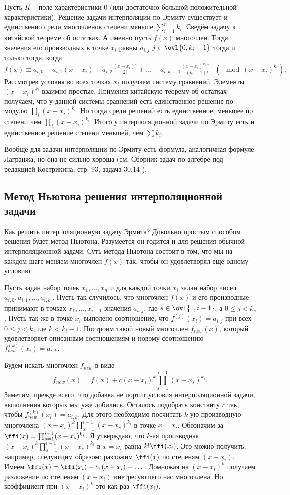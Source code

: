 \thrm Пусть $K$ -- поле характеристики 0 (или достаточно большой положительной характеристики). Решение задачи интерполяции по Эрмиту существует и единственно среди многочленов степени меньше $\sum_{i=1}^n k_i$.
\ethrm
\proof Сведём задачу к китайской теореме об остатках. А именно пусть $f(x)$ многочлен. Тогда значения его производных в точке $x_i$ равны $a_{i,j}$ $j\in \ovl{0,k_i-1}$ тогда и только тогда, когда
$$f(x)\equiv a_{i,0}+a_{i,1}(x-x_i)+a_{i,2}\tfrac{(x-x_i)^2}{2!}+\dots+ a_{i,k_i-1}\tfrac{(x-x_i)^{k_i-1}}{(k_i-1)!}\,\, (\mod (x-x_i)^{k_i}).$$
Рассмотрев условия во всех точках $x_i$ получаем систему сравнений. Элементы $(x-x_i)^{k_i}$ взаимно простые. Применяя китайскую теорему об остатках получаем, что у данной системы сравнений есть единственное решение по модулю $\prod_{i}(x-x_i)^{k_i}$. Но тогда среди решений есть единственное, меньшее по степени чем $\prod_{i}(x-x_i)^{k_i}$. Итого у интерполяционной задачи по Эрмиту есть и единственное решение степени меньшей, чем $\sum k_i$.
\endproof

\rm Вообще для  задачи интерполяции по Эрмиту  есть формула, аналогичная формуле Лагранжа, но она не сильно хороша (см. Сборник задач по алгебре под редакцией Кострикина, стр. 93, задача 30.14 ).\erm

\subsection{Метод Ньютона решения интерполяционной задачи}

Как решить интерполяционную задачу Эрмита? Довольно простым способом решения будет метод Ньютона. Разумеется он годится и для решения обычной интерполяционной задачи. Суть метода Ньютона состоит в том, что мы на каждом шаге меняем многочлен $f(x)$ так, чтобы он удовлетворял  ещё одному условию. 

Пусть задан набор точек $x_1,\dots, x_n$ и для каждой точки $x_i$ задан набор чисел $a_{i,0}, a_{i,1},\dots , a_{i,k_i}$. Пусть так случилось, что многочлен $f(x)$ и его производные принимают в точках $x_1,\dots,x_{i-1}$  значения $a_{s,j}$, где $s\in \ovl{1,i-1}$, а $0\leq j< k_s$. Пусть так же в точке $x_i$ выполено соотношение, что $f^{(j)}(x_i)=a_{i,j}$ при всех $0\leq j<k$, где $k<k_i-1$. Построим такой новый многочлен $f_{new}(x)$, который удовлетворяет описанным соотношениям и новому соотношению $f^{(k)}_{new}(x_i)=a_{i,k}$.

Будем искать многочлен $f_{new}$ в виде $$f_{new}(x)= f(x)+c (x-x_i)^k\prod_{s=1}^{i-1} (x-x_s)^{k_s}.$$
Заметим, прежде всего, что добавка не портит условия интерполяционной задачи, выполнения которых мы уже добились. Осталось подобрать константу $c$ так, чтобы $f^{(k)}_{new}(x_i)=a_{i,k}$. Для этого необходимо посчитать $k$-ую производную многочлена $(x-x_i)^k\prod_{s=1}^{i-1} (x-x_s)^{k_i}$  в точке $x=x_i$. Обозначим за $\ffi(x)=\prod_{s=1}^{i-1} (x-x_s)^{k_i}$. Я утверждаю, что $k$-ая производная $(x-x_i)^k\prod_{s=1}^{i-1} (x-x_s)^{k_i}$ в $x=x_i$ равна $k!\ffi(x_i)$. Это можно получить, например, следующим образом: разложим $\ffi(x)$ по степеням $(x-x_i)$. Имеем $\ffi(x)=\ffi(x_i)+c_1(x-x_i)+\dots$. Домножая на $(x-x_i)^k$ получаем разложение по степеням $(x-x_i)$ инетресующего нас многочлена. Но коэффициент при $(x-x_i)^k$ это как раз $\ffi(x_i)$. 

